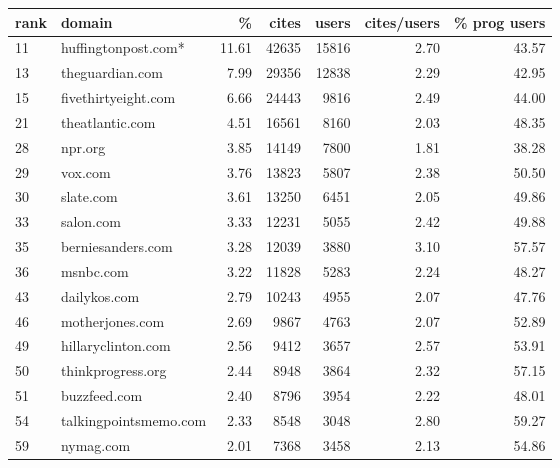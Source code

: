 \begin{tabular}{llrrrrr}
\toprule
rank & domain & \% & cites & users & cites/users & \% prog users \\
\midrule
11               &    huffingtonpost.com* &   11.61 &   42635 &   15816 &         2.70 &         43.57 \\
13               &        theguardian.com &    7.99 &   29356 &   12838 &         2.29 &         42.95 \\
15               &    fivethirtyeight.com &    6.66 &   24443 &    9816 &         2.49 &         44.00 \\
21               &        theatlantic.com &    4.51 &   16561 &    8160 &         2.03 &         48.35 \\
28               &                npr.org &    3.85 &   14149 &    7800 &         1.81 &         38.28 \\
29               &                vox.com &    3.76 &   13823 &    5807 &         2.38 &         50.50 \\
30               &              slate.com &    3.61 &   13250 &    6451 &         2.05 &         49.86 \\
33               &              salon.com &    3.33 &   12231 &    5055 &         2.42 &         49.88 \\
35               &      berniesanders.com &    3.28 &   12039 &    3880 &         3.10 &         57.57 \\
36               &              msnbc.com &    3.22 &   11828 &    5283 &         2.24 &         48.27 \\
43               &           dailykos.com &    2.79 &   10243 &    4955 &         2.07 &         47.76 \\
46               &        motherjones.com &    2.69 &    9867 &    4763 &         2.07 &         52.89 \\
49               &     hillaryclinton.com &    2.56 &    9412 &    3657 &         2.57 &         53.91 \\
50               &      thinkprogress.org &    2.44 &    8948 &    3864 &         2.32 &         57.15 \\
51               &           buzzfeed.com &    2.40 &    8796 &    3954 &         2.22 &         48.01 \\
54               &  talkingpointsmemo.com &    2.33 &    8548 &    3048 &         2.80 &         59.27 \\
59               &              nymag.com &    2.01 &    7368 &    3458 &         2.13 &         54.86 \\

\end{tabular}
